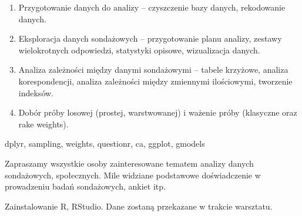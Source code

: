 \documentclass[\main/boa.tex]{subfiles}
\begin{document}
\planwarsztatu
\begin{enumerate}
\item Przygotowanie danych do analizy – czyszczenie bazy danych, rekodowanie danych.
\item Eksploracja danych sondażowych – przygotowanie planu analizy, zestawy wielokrotnych odpowiedzi, statystyki opisowe, wizualizacja danych.
\item Analiza zależności między danymi sondażowymi – tabele krzyżowe, analiza korespondencji, analiza zależności między zmiennymi ilościowymi, tworzenie indeksów.
\item Dobór próby losowej (prostej, warstwowanej) i ważenie próby (klasyczne oraz rake weights).
\end{enumerate}	 

\pakiety dplyr, sampling, weights, questionr, ca, ggplot, gmodels

\umiejetnosci Zapraszamy wszystkie osoby zainteresowane tematem analizy danych sondażowych, społecznych. Mile widziane podstawowe doświadczenie w prowadzeniu badań sondażowych, ankiet itp.

\wymagania Zainstalowanie R, RStudio. Dane zostaną przekazane w trakcie warsztatu.
\end{document}
